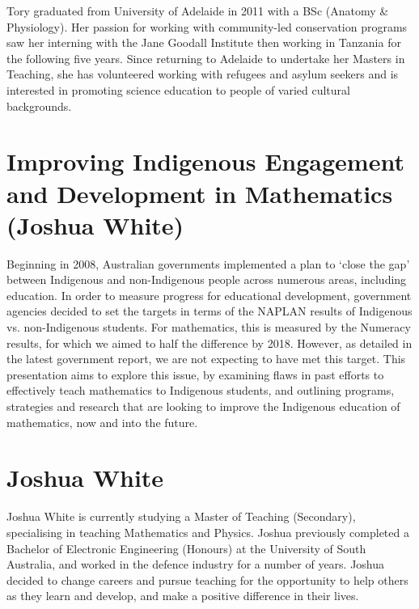 \documentclass[twoside,12pt,a4paper,notitlepage]{memoir}
\begin{document}
Tory graduated from University of Adelaide in 2011 with a BSc (Anatomy \& Physiology). Her passion for working with community-led conservation programs saw her interning with the Jane Goodall Institute then working in Tanzania for the following five years. Since returning to Adelaide to undertake her Masters in Teaching, she has volunteered working with refugees and asylum seekers and is interested in promoting science education to people of varied cultural backgrounds.



\pagebreak
\section*{Improving Indigenous Engagement and Development in Mathematics (Joshua White)}
\label{aut:white}

Beginning in 2008, Australian governments implemented a plan to ‘close the gap’ between Indigenous and non-Indigenous people across numerous areas, including education. In order to measure progress for educational development, government agencies decided to set the targets in terms of the NAPLAN results of Indigenous vs. non-Indigenous students. For mathematics, this is measured by the Numeracy results, for which we aimed to half the difference by 2018. However, as detailed in the latest government report, we are not expecting to have met this target.
This presentation aims to explore this issue, by examining flaws in past efforts to effectively teach mathematics to Indigenous students, and outlining programs, strategies and research that are looking to improve the Indigenous education of mathematics, now and into the future.

\section*{Joshua White}

Joshua White is currently studying a Master of Teaching (Secondary), specialising in teaching Mathematics and Physics. Joshua previously completed a Bachelor of Electronic Engineering (Honours) at the University of South Australia, and worked in the defence industry for a number of years. Joshua decided to change careers and pursue teaching for the opportunity to help others as they learn and develop, and make a positive difference in their lives.
\end{document}
